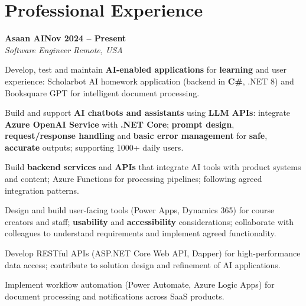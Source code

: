 \documentclass[letterpaper,10pt]{article}
\newcommand{\headingBf}[2]{
  \hspace{10pt}\textbf{#1}\hfill\textbf{#2}\\
}
\newcommand{\headingIt}[2]{
  \hspace{10pt}\textit{#1}\hfill\textit{#2}\\
}
\newenvironment{resume_list}{
  \vspace{-7pt}
  \begin{itemize}[itemsep=-2px, parsep=1pt, leftmargin=30pt]
}{
  \end{itemize}
}
\begin{document}
\section{Professional Experience}

\headingBf{Asaan AI}{Nov 2024 -- Present}
\headingIt{Software Engineer \hfill Remote, USA}{}
\begin{resume_list}
    \item Develop, test and maintain \textbf{AI-enabled applications} for \textbf{learning} and user experience: Scholarbot AI homework application (backend in \textbf{C\#}, .NET 8) and Booksquare GPT for intelligent document processing.
    \item Build and support \textbf{AI chatbots and assistants} using \textbf{LLM APIs}: integrate \textbf{Azure OpenAI Service} with \textbf{.NET Core}; \textbf{prompt design}, \textbf{request/response handling} and \textbf{basic error management} for \textbf{safe}, \textbf{accurate} outputs; supporting 1000+ daily users.
    \item Build \textbf{backend services} and \textbf{APIs} that integrate AI tools with product systems and content; Azure Functions for processing pipelines; following agreed integration patterns.
    \item Design and build user-facing tools (Power Apps, Dynamics 365) for course creators and staff; \textbf{usability} and \textbf{accessibility} considerations; collaborate with colleagues to understand requirements and implement agreed functionality.
    \item Develop RESTful APIs (ASP.NET Core Web API, Dapper) for high-performance data access; contribute to solution design and refinement of AI applications.
    \item Implement workflow automation (Power Automate, Azure Logic Apps) for document processing and notifications across SaaS products.
\end{resume_list}
\end{document}
